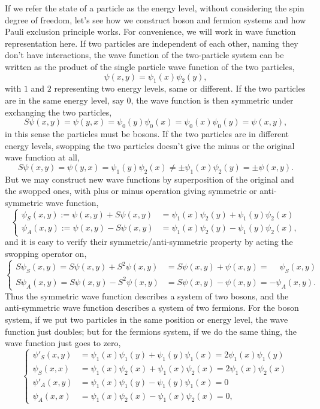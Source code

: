 \documentclass{article}
\newcommand{\be}{\begin{equation}}
\newcommand{\ee}{\end{equation}}
\renewcommand{\1}{\left}
\renewcommand{\2}{\right}
\begin{document}
If we refer the state of a particle as the energy level, without considering the spin degree of freedom, let's see how we construct boson and fermion systems and how Pauli exclusion principle works. For convenience, we will work in wave function representation here. If two particles are independent of each other, naming they don't have interactions, the wave function of the two-particle system can be written as the product of the single particle wave function of the two particles, \be \psi(x,y)=\psi_1(x)\psi_2(y), \ee with $1$ and $2$ representing two energy levels, same or different. If the two particles are in the same energy level, say $0$, the wave function is then symmetric under exchanging the two particles,
\be S\psi(x,y)=\psi(y,x)=\psi_0(y)\psi_0(x)=\psi_0(x)\psi_0(y)=\psi(x,y), \ee
in this sense the particles must be bosons. If the two particles are in different energy levels, swopping the two particles doesn't give the minus or the original wave function at all,
\be S\psi(x,y)=\psi(y,x)=\psi_1(y)\psi_2(x) \ne \pm\psi_1(x)\psi_2(y)=\pm \psi(x,y). \ee
But we may construct new wave functions by superposition of the original and the swopped ones, with plus or minus operation giving symmetric or anti-symmetric wave function,
\be\1\{\begin{split}
\psi_S(x,y):=\psi(x,y)+S\psi(x,y)&=\psi_1(x)\psi_2(y)+\psi_1(y)\psi_2(x)\\
\psi_A(x,y):=\psi(x,y)-S\psi(x,y)&=\psi_1(x)\psi_2(y)-\psi_1(y)\psi_2(x),
\end{split}\2.\ee
and it is easy to verify their symmetric/anti-symmetric property by acting the swopping operator on,
\be\1\{\begin{split}
S\psi_S(x,y)=S\psi(x,y)+S^2\psi(x,y)&=S\psi(x,y)+\psi(x,y)=\phantom{-}\psi_S(x,y)\\
S\psi_A(x,y)=S\psi(x,y)-S^2\psi(x,y)&=S\psi(x,y)-\psi(x,y)=-\psi_A(x,y).
\end{split}\2.\ee
Thus the symmetric wave function describes a system of two bosons, and the anti-symmetric wave function describes a system of two fermions. For the boson system, if we put two particles in the same position or energy level, the wave function just doubles; but for the fermions system, if we do the same thing, the wave function just goes to zero,
\be\1\{\begin{split}
\psi'_S(x,y)&=\psi_1(x)\psi_1(y)+\psi_1(y)\psi_1(x)=2\psi_1(x)\psi_1(y)\\
\psi_S(x,x)&=\psi_1(x)\psi_2(x)+\psi_1(x)\psi_2(x)=2\psi_1(x)\psi_2(x)\\
\psi'_A(x,y)&=\psi_1(x)\psi_1(y)-\psi_1(y)\psi_1(x)=0\\
\psi_A(x,x)&=\psi_1(x)\psi_2(x)-\psi_1(x)\psi_2(x)=0,
\end{split}\2.\ee
\end{document}
